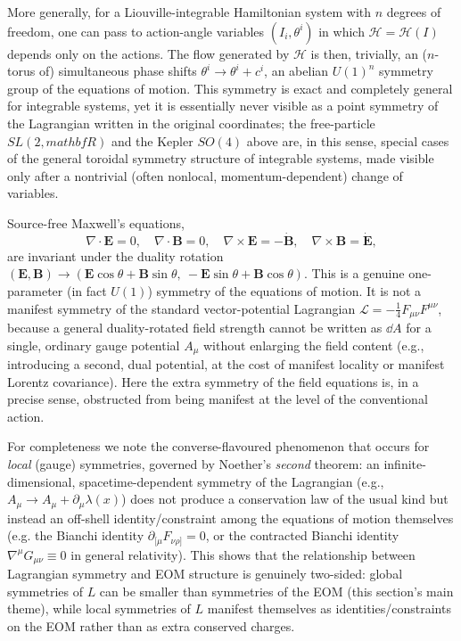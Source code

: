 \begin{example}
More generally, for a Liouville-integrable Hamiltonian system with $n$ degrees
    of freedom, one can pass to action-angle variables $(I_i,\theta^i)$ in
    which $\mathcal{H} = \mathcal{H}(I)$ depends only on the actions. The flow generated by
    $\mathcal{H}$ is then, trivially, an ($n$-torus of) simultaneous phase shifts
    $\theta^i \to \theta^i+c^i$, an abelian $U(1)^n$ symmetry group of the
    equations of motion. This symmetry is exact and completely general for
    integrable systems, yet it is essentially never visible as a point symmetry
    of the Lagrangian written in the original coordinates; the free-particle
    $SL(2,mathbf R)$ and the Kepler $SO(4)$ above are, in this sense, special
    cases of the general toroidal symmetry structure of integrable systems,
    made visible only after a nontrivial (often nonlocal, momentum-dependent)
    change of variables.
\end{example}

\begin{example}
Source-free Maxwell's equations,
\[
\nabla\!\cdot\!\bm E=0,\quad \nabla\!\cdot\!\bm B=0,\quad \nabla\times \bm E=-\dot{\bm B},\quad \nabla\times\bm B=\dot{\bm E},
\]
are invariant under the duality rotation $(\bm E,\bm B)\to(\bm E\cos\theta+\bm
    B\sin\theta,\ -\bm E\sin\theta+\bm B\cos\theta)$. This is a genuine
    one-parameter (in fact $U(1)$) symmetry of the equations of motion. It is
    not a manifest symmetry of the standard vector-potential Lagrangian
    $\mathcal{L}=-\tfrac14 F_{\mu\nu}F^{\mu\nu}$, because a general duality-rotated
    field strength cannot be written as $\dd A$ for a single, ordinary gauge
    potential $A_\mu$ without enlarging the field content (e.g., introducing a
    second, dual potential, at the cost of manifest locality or manifest
    Lorentz covariance). Here the extra symmetry of the field equations is, in
    a precise sense, obstructed from being manifest at the level of the
    conventional action.
\end{example}

\begin{remark}
For completeness we note the converse-flavoured phenomenon that occurs for
    \emph{local} (gauge) symmetries, governed by Noether's \emph{second}
    theorem: an infinite-dimensional, spacetime-dependent symmetry of the
    Lagrangian (e.g., $A_\mu\to A_\mu+\partial_\mu\lambda(x)$) does not produce
    a conservation law of the usual kind but instead an off-shell
    identity/constraint among the equations of motion themselves (e.g. the
    Bianchi identity $\partial_{[\mu}F_{\nu\rho]}=0$, or the contracted Bianchi
    identity $\nabla^\mu G_{\mu\nu}\equiv0$ in general relativity). This shows
    that the relationship between Lagrangian symmetry and EOM structure is
    genuinely two-sided: global symmetries of $L$ can be smaller than
    symmetries of the EOM (this section's main theme), while local symmetries
    of $L$ manifest themselves as identities/constraints on the EOM rather than
    as extra conserved charges.
\end{remark}

